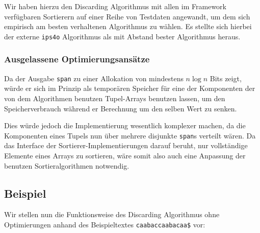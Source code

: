 Wir haben hierzu den Discarding Algorithmus mit allen im Framework verfügbaren Sortierern auf einer Reihe von Testdaten angewandt, um dem sich empirisch am besten verhaltenen Algorithmus zu wählen. Es stellte sich hierbei der externe \texttt{ips4o} Algorithmus als mit Abstand bester Algorithmus heraus.


\subsubsection{Ausgelassene Optimierungsansätze}

Da der Ausgabe \texttt{span} zu einer Allokation von mindestens $n \log n$ Bits zeigt, würde er sich im Prinzip als temporären Speicher für eine der Komponenten der von dem Algorithmen benutzen Tupel-Arrays benutzen lassen, um den Speicherverbrauch während er Berechnung um den selben Wert zu senken. 


Dies würde jedoch die Implementierung wesentlich komplexer machen, da die Komponenten eines Tupels nun über mehrere disjunkte \texttt{span}s verteilt wären. Da das Interface der Sortierer-Implementierungen darauf beruht, nur vollständige Elemente eines Arrays zu sortieren, wäre somit also auch eine Anpassung der benutzen Sortieralgorithmen notwendig.

\subsection{Beispiel}

Wir stellen nun die Funktionsweise des Discarding Algorithmus ohne Optimierungen anhand des Beispieltextes \texttt{caabaccaabacaa\$} vor:



